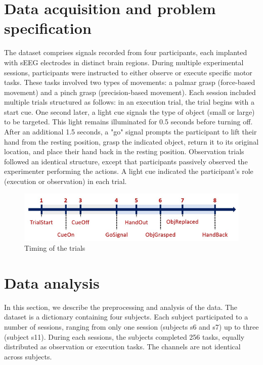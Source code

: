 \documentclass[10pt,conference,compsocconf]{IEEEtran}
\begin{document}
\section{Data acquisition and problem specification}
\label{sec:problem}
The dataset comprises signals recorded from four participants, each implanted with sEEG electrodes in distinct brain regions. During multiple experimental sessions, participants were instructed to either observe or execute specific motor tasks. These tasks involved two types of movements: a palmar grasp (force-based movement) and a pinch grasp (precision-based movement). Each session included multiple trials structured as follows: in an execution trial, the trial begins with a start cue. One second later, a light cue signals the type of object (small or large) to be targeted. This light remains illuminated for 0.5 seconds before turning off. After an additional 1.5 seconds, a "go" signal prompts the participant to lift their hand from the resting position, grasp the indicated object, return it to its original location, and place their hand back in the resting position. Observation trials followed an identical structure, except that participants passively observed the experimenter performing the actions. A light cue indicated the participant's role (execution or observation) in each trial.

\begin{figure}[h!]
  \center
  \includegraphics[width=\linewidth]{images/2024-12-11-13-41-48.png}
  \caption{Timing of the trials}
\end{figure}
\FloatBarrier

\section{Data analysis}
\label{sec:analysis}
In this section, we describe the preprocessing and analysis of the data. The dataset is a dictionary containing four subjects. Each subject participated to a number of sessions, ranging from only one session (subjects s6 and s7) up to three (subject s11). During each sessions, the subjects completed 256 tasks, equally distributed as observation or execution tasks. The channels are not identical across subjects.
\end{document}
